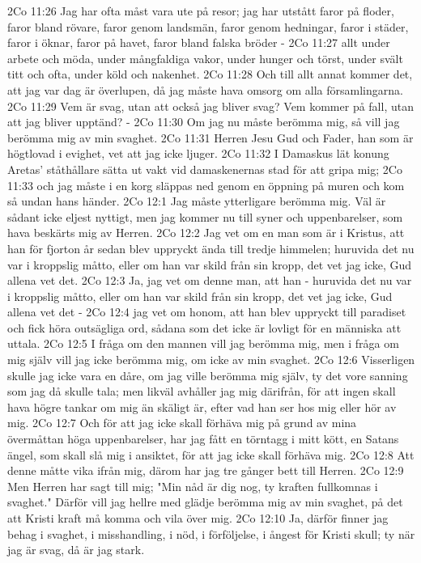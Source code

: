 2Co 11:26  Jag har ofta måst vara ute på resor; jag har utstått faror på floder, faror bland rövare, faror genom landsmän, faror genom hedningar, faror i städer, faror i öknar, faror på havet, faror bland falska bröder -
2Co 11:27  allt under arbete och möda, under mångfaldiga vakor, under hunger och törst, under svält titt och ofta, under köld och nakenhet.
2Co 11:28  Och till allt annat kommer det, att jag var dag är överlupen, då jag måste hava omsorg om alla församlingarna.
2Co 11:29  Vem är svag, utan att också jag bliver svag? Vem kommer på fall, utan att jag bliver upptänd? -
2Co 11:30  Om jag nu måste berömma mig, så vill jag berömma mig av min svaghet.
2Co 11:31  Herren Jesu Gud och Fader, han som är högtlovad i evighet, vet att jag icke ljuger.
2Co 11:32  I Damaskus lät konung Aretas' ståthållare sätta ut vakt vid damaskenernas stad för att gripa mig;
2Co 11:33  och jag måste i en korg släppas ned genom en öppning på muren och kom så undan hans händer.
2Co 12:1  Jag måste ytterligare berömma mig. Väl är sådant icke eljest nyttigt, men jag kommer nu till syner och uppenbarelser, som hava beskärts mig av Herren.
2Co 12:2  Jag vet om en man som är i Kristus, att han för fjorton år sedan blev uppryckt ända till tredje himmelen; huruvida det nu var i kroppslig måtto, eller om han var skild från sin kropp, det vet jag icke, Gud allena vet det.
2Co 12:3  Ja, jag vet om denne man, att han - huruvida det nu var i kroppslig måtto, eller om han var skild från sin kropp, det vet jag icke, Gud allena vet det -
2Co 12:4  jag vet om honom, att han blev uppryckt till paradiset och fick höra outsägliga ord, sådana som det icke är lovligt för en människa att uttala.
2Co 12:5  I fråga om den mannen vill jag berömma mig, men i fråga om mig själv vill jag icke berömma mig, om icke av min svaghet.
2Co 12:6  Visserligen skulle jag icke vara en dåre, om jag ville berömma mig själv, ty det vore sanning som jag då skulle tala; men likväl avhåller jag mig därifrån, för att ingen skall hava högre tankar om mig än skäligt är, efter vad han ser hos mig eller hör av mig.
2Co 12:7  Och för att jag icke skall förhäva mig på grund av mina övermåttan höga uppenbarelser, har jag fått en törntagg i mitt kött, en Satans ängel, som skall slå mig i ansiktet, för att jag icke skall förhäva mig.
2Co 12:8  Att denne måtte vika ifrån mig, därom har jag tre gånger bett till Herren.
2Co 12:9  Men Herren har sagt till mig; "Min nåd är dig nog, ty kraften fullkomnas i svaghet." Därför vill jag hellre med glädje berömma mig av min svaghet, på det att Kristi kraft må komma och vila över mig.
2Co 12:10  Ja, därför finner jag behag i svaghet, i misshandling, i nöd, i förföljelse, i ångest för Kristi skull; ty när jag är svag, då är jag stark.
